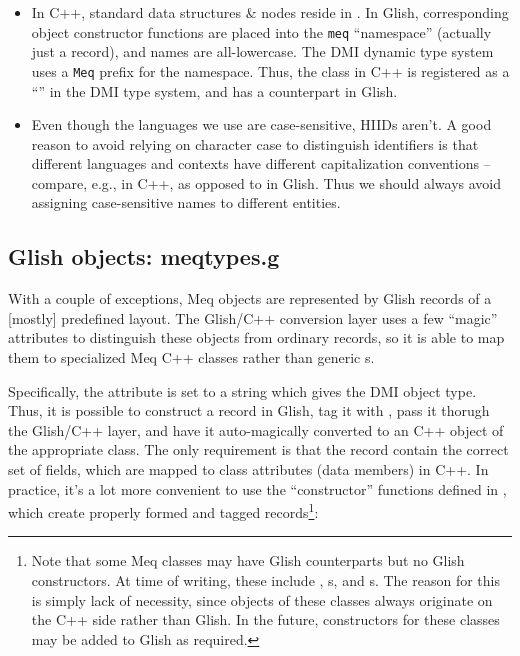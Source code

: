   \begin{itemize}

  \item In C++, standard data structures \& nodes reside in .
    In Glish, corresponding object constructor functions are placed into the
    {\tt meq} ``namespace'' (actually just a record), and names are
    all-lowercase. The DMI dynamic type system uses a {\tt Meq} prefix for the
    namespace. Thus, the  class in C++ is registered as a
    ``'' in the DMI type system, and  has a 
    counterpart in Glish.

  \item Even though the languages we use are case-sensitive, HIIDs aren't. A
    good reason to avoid relying on character case to distinguish identifiers is
    that different languages and contexts have different capitalization
    conventions -- compare, e.g.,  in C++, as opposed to
     in Glish. Thus we should always avoid assigning
    case-sensitive names to different entities.

  \end{itemize}

\subsection{Glish  objects: meqtypes.g}

  With a couple of exceptions, Meq objects are represented by Glish records of
  a [mostly] predefined layout. The Glish/C++ conversion layer uses a few
  ``magic'' attributes to distinguish these objects from ordinary records, so
  it is able to map them to specialized Meq C++ classes rather than generic
  s. 

  Specifically, the  attribute is set to a string which
  gives the DMI object type. Thus, it is possible to construct a record in
  Glish, tag it with , pass it thorugh the Glish/C++
  layer, and have it auto-magically converted to an C++ object of the
  appropriate class. The only requirement is that the record contain the
  correct set of fields, which are mapped to class attributes (data members) in
  C++. In practice, it's a lot more convenient to use the ``constructor''
  functions defined in , which create properly formed and
  tagged records\footnote{Note that some Meq classes may have Glish
  counterparts but no Glish constructors. At time of writing, these include
  \Vells, \VellSet{}s, and \Result{}s. The reason for this is simply lack of
  necessity, since objects of these classes always originate on the C++ side
  rather than Glish. In the future, constructors for these classes may be added
  to Glish as required.}:

